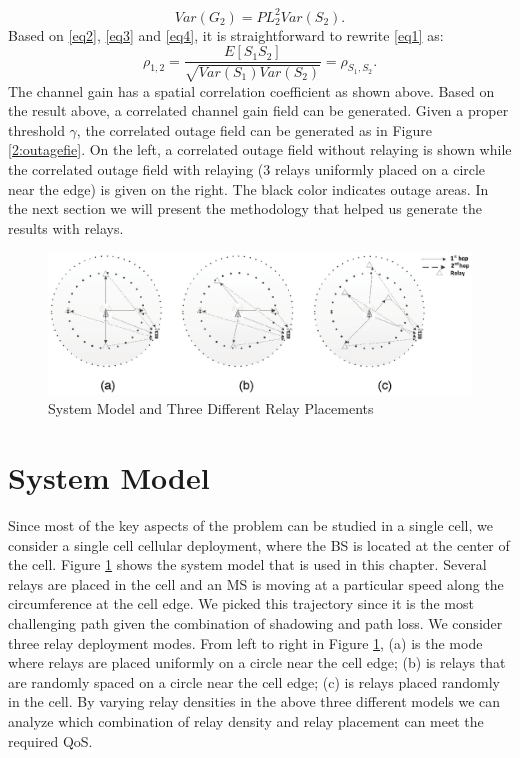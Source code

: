\begin{equation}
Var(G_{2}) = PL_{2}^{2}Var(S_{2}).
\label{eq4}
\end{equation}
Based on \eqref{eq2}, \eqref{eq3} and \eqref{eq4}, it is straightforward to rewrite \eqref{eq1} as:
\begin{equation}
\rho_{1,2} = \frac{E[S_{1}S_{2}]}{\sqrt{Var(S_{1})Var(S_{2})}} = \rho_{S_{1},S_{2}}.
\end{equation}
The channel gain has a spatial correlation coefficient as shown above. Based on the result above, a correlated channel gain field can be generated. Given a proper threshold $\gamma$, the correlated outage field can be generated as in Figure \ref{2:outagefie}. On the left, a correlated outage field without relaying is shown while the correlated outage field with relaying (3 relays uniformly placed on a circle near the edge) is given on the right. The black color indicates outage areas. In the next section we will present the methodology that helped us generate the results with relays.

\begin{figure}
\centering
\includegraphics[width=14cm]{abc.eps}
\caption{System Model and Three Different Relay Placements}
\label{threemodels}
\end{figure}
\section{System Model}
\label{sec:SystemModel}
Since most of the key aspects of the problem can be studied in a single cell, we consider a single cell cellular deployment, where the BS is located at the center of the cell.  Figure \ref{threemodels} shows the system model that is used in this chapter. Several relays are placed in the cell and an MS is moving at a particular speed along the circumference at the cell edge. We picked this trajectory since it is the most challenging path given the combination of shadowing and path loss. We consider three relay deployment modes. From left to right in Figure \ref{threemodels}, (a) is the mode where relays are placed uniformly on a circle near the cell edge; (b) is relays that are randomly spaced on a circle near the cell edge; (c) is relays placed randomly in the cell. By varying relay densities in the above three different models we can analyze which combination of relay density and relay placement can meet the required QoS.

